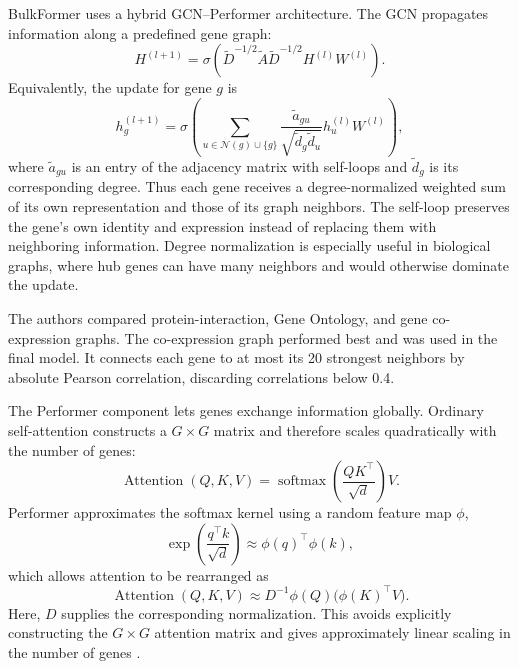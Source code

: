 \documentclass[11pt]{article}
\begin{document}
BulkFormer uses a hybrid GCN--Performer architecture. The GCN propagates
information along a predefined gene graph:
\begin{equation}
    H^{(l+1)} = \sigma\!\left(
        \widetilde{D}^{-1/2}\widetilde{A}
        \widetilde{D}^{-1/2}H^{(l)}W^{(l)}
    \right).
\end{equation}
Equivalently, the update for gene $g$ is
\begin{equation}
    h_g^{(l+1)} = \sigma\!\left(
        \sum_{u\in\mathcal{N}(g)\cup\{g\}}
        \frac{\widetilde{a}_{gu}}
        {\sqrt{\widetilde{d}_g\widetilde{d}_u}}
        h_u^{(l)}W^{(l)}
    \right),
\end{equation}
where $\widetilde{a}_{gu}$ is an entry of the adjacency matrix with self-loops
and $\widetilde{d}_g$ is its corresponding degree. Thus each gene
receives a degree-normalized weighted sum of its own representation and those
of its graph neighbors. The self-loop preserves the gene's own identity and
expression instead of replacing them with neighboring information. Degree
normalization is especially useful in biological graphs, where hub genes can
have many neighbors and would otherwise dominate the update.

The authors compared protein-interaction, Gene Ontology, and gene
co-expression graphs. The co-expression graph performed best and was used in
the final model. It connects each gene to at most its 20 strongest neighbors by
absolute Pearson correlation, discarding correlations below 0.4.

The Performer component lets genes exchange information globally. Ordinary
self-attention constructs a $G\times G$ matrix and therefore scales
quadratically with the number of genes:
\begin{equation}
    \operatorname{Attention}(Q,K,V)
    = \operatorname{softmax}\!\left(
        \frac{QK^{\top}}{\sqrt{d}}
    \right)V.
\end{equation}
Performer approximates the softmax kernel using a random feature map $\phi$,
\begin{equation}
    \exp\!\left(\frac{q^{\top}k}{\sqrt{d}}\right)
    \approx\phi(q)^{\top}\phi(k),
\end{equation}
which allows attention to be rearranged as
\begin{equation}
    \operatorname{Attention}(Q,K,V)
    \approx D^{-1}\phi(Q)\bigl(\phi(K)^{\top}V\bigr).
\end{equation}
Here, $D$ supplies the corresponding normalization. This avoids explicitly
constructing the $G\times G$ attention matrix and gives approximately linear
scaling in the number of genes \cite{choromanski2021rethinking}.
\end{document}
